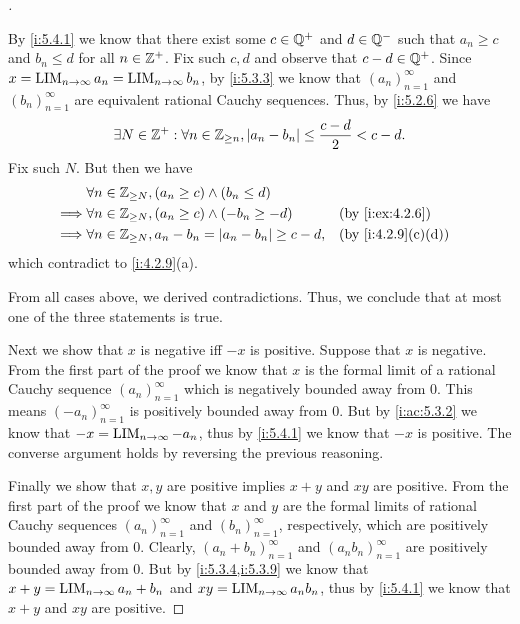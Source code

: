 \begin{proof}[]
\begin{itemize}
          By \cref{i:5.4.1} we know that there exist some \(c \in \mathbb{Q}^+\) and \(d \in \mathbb{Q}^-\) such that \(a_n \geq c\) and \(b_n \leq d\) for all \(n \in \mathbb{Z}^+\).
          Fix such \(c, d\) and observe that \(c - d \in \mathbb{Q}^+\).
          Since \(x = \operatorname*{LIM}_{n \to \infty} a_n = \operatorname*{LIM}_{n \to \infty} b_n\), by \cref{i:5.3.3} we know that \((a_n)_{n = 1}^\infty\) and \((b_n)_{n = 1}^\infty\) are equivalent rational Cauchy sequences.
          Thus, by \cref{i:5.2.6} we have
          \[
            \exists N \in \mathbb{Z}^+ : \forall n \in \mathbb{Z}_{\geq n}, \left\lvert a_n - b_n\right\rvert \leq \dfrac{c - d}{2} < c - d.
          \]
          Fix such \(N\).
          But then we have
          \begin{align*}
                     & \forall n \in \Z_{\geq N}, (a_n \geq c) \land (b_n \leq d)                                \\
            \implies & \forall n \in \Z_{\geq N}, (a_n \geq c) \land (-b_n \geq -d)       &  & \by{i:ex:4.2.6}   \\
            \implies & \forall n \in \Z_{\geq N}, a_n - b_n = \abs{a_n - b_n} \geq c - d, &  & \by{i:4.2.9}[c,d]
          \end{align*}
          which contradict to \cref{i:4.2.9}(a).
  \end{itemize}
  From all cases above, we derived contradictions.
  Thus, we conclude that at most one of the three statements is true.

  Next we show that \(x\) is negative iff \(-x\) is positive.
  Suppose that \(x\) is negative.
  From the first part of the proof we know that \(x\) is the formal limit of a rational Cauchy sequence \((a_n)_{n = 1}^\infty\) which is negatively bounded away from \(0\).
  This means \((-a_n)_{n = 1}^\infty\) is positively bounded away from \(0\).
  But by \cref{i:ac:5.3.2} we know that \(-x = \operatorname*{LIM}_{n \to \infty} -a_n\), thus by \cref{i:5.4.1} we know that \(-x\) is positive.
  The converse argument holds by reversing the previous reasoning.

  Finally we show that \(x, y\) are positive implies \(x + y\) and \(xy\) are positive.
  From the first part of the proof we know that \(x\) and \(y\) are the formal limits of rational Cauchy sequences \((a_n)_{n = 1}^\infty\) and \((b_n)_{n = 1}^\infty\), respectively, which are positively bounded away from \(0\).
  Clearly, \((a_n + b_n)_{n = 1}^\infty\) and \((a_n b_n)_{n = 1}^\infty\) are positively bounded away from \(0\).
  But by \cref{i:5.3.4,i:5.3.9} we know that \(x + y = \operatorname*{LIM}_{n \to \infty} a_n + b_n\) and \(xy = \operatorname*{LIM}_{n \to \infty} a_n b_n\), thus by \cref{i:5.4.1} we know that \(x + y\) and \(xy\) are positive.
\end{proof}

